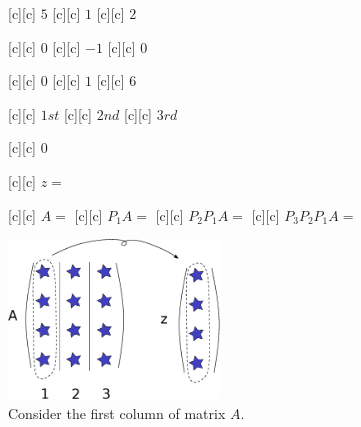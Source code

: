 \begin{figure}[htb!]
	\centering
	\footnotesize

	[c] {$5$}
	[c] {$1$}
	[c] {$2$}

	[c] {$0$}
	[c] {$-1$}
	[c] {$0$}

	[c] {$0$}
	[c] {$1$}
	[c] {$6$}

	[c] {$1st$}
	[c] {$2nd$}
	[c] {$3rd$}

	[c] {$0$}

	[c] {$z=$}

	[c] {$A=$}
	[c] {$P_{1}A=$}
	[c] {$P_{2}P_{1}A=$}
	[c] {$P_{3}P_{2}P_{1}A=$}


	\includegraphics[width=0.5\textwidth]{householder_matrixA.eps}
	\caption{Consider the first column of matrix $A$.}
	\label{\LABEL}
\end{figure}

